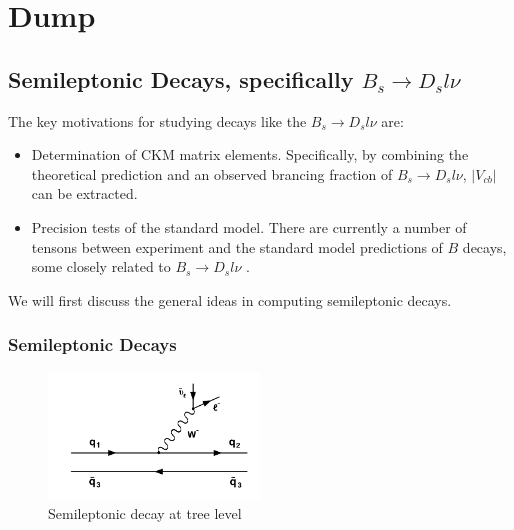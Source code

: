 \chapter{Dump}
\label{chap:sm}


\section{Semileptonic Decays, specifically $B_s \to D_s l \nu$}
\label{sec:semileptonic}

The key motivations for studying decays like the $B_s \to D_s l\nu$ are:
\begin{itemize}
	\item
	Determination of CKM matrix elements. Specifically, by combining the theoretical prediction and an observed brancing fraction of $B_s \to D_s l\nu$, $|V_{cb}|$ can be extracted.
	\item
	Precision tests of the standard model. There are currently a number of tensons between experiment and the standard model predictions of $B$ decays, some closely related to $B_s \to D_s l\nu$ \cite{Na:2015kha}.
\end{itemize}
We will first discuss the general ideas in computing semileptonic decays.

\subsection{Semileptonic Decays}
\label{sec:cp}

\begin{figure}
  \begin{center}
  \vspace{-25pt}
    \includegraphics[width=
   0.5\textwidth]{images/semileptonic.png}
     \vspace{-25pt}
  \end{center}
  \caption{Semileptonic decay at tree level}
  \vspace{+10pt}
  \label{fig:semileptonic}
\end{figure}

